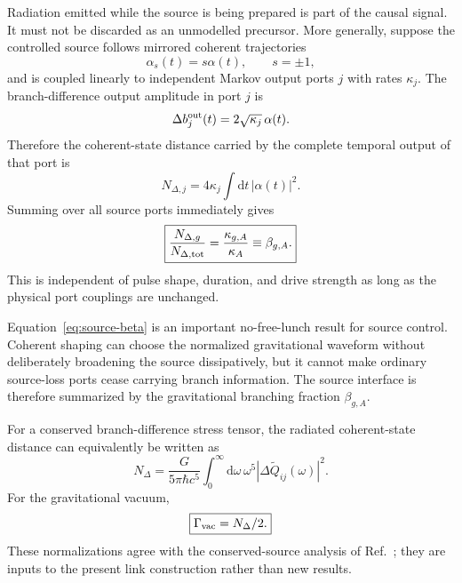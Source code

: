 \documentclass[11pt]{article}
\newcommand{\dd}{\mathrm{d}}
\begin{document}
Radiation emitted while the source is being prepared is part of the causal signal. It must not be discarded as an unmodelled precursor. More generally, suppose the controlled source follows mirrored coherent trajectories
\begin{equation}
\alpha_s(t)=s\alpha(t),
\qquad s=\pm1,
\end{equation}
and is coupled linearly to independent Markov output ports $j$ with rates $\kappa_j$. The branch-difference output amplitude in port $j$ is
\begin{equation}
\Delta b_j^{\rm out}(t)=2\sqrt{\kappa_j}\,\alpha(t).
\end{equation}
Therefore the coherent-state distance carried by the complete temporal output of that port is
\begin{equation}
\boxed{
N_{\Delta,j}
=4\kappa_j\int\dd t\,|\alpha(t)|^2.
}
\label{eq:Npartition}
\end{equation}
Summing over all source ports immediately gives
\begin{equation}
\boxed{
\frac{N_{\Delta,g}}
{N_{\Delta,{\rm tot}}}
=
\frac{\kappa_{g,A}}{\kappa_A}
\equiv\beta_{g,A}.
}
\label{eq:source-beta}
\end{equation}
This is independent of pulse shape, duration, and drive strength as long as the physical port couplings are unchanged.

Equation~\eqref{eq:source-beta} is an important no-free-lunch result for source control. Coherent shaping can choose the normalized gravitational waveform without deliberately broadening the source dissipatively, but it cannot make ordinary source-loss ports cease carrying branch information. The source interface is therefore summarized by the gravitational branching fraction $\beta_{g,A}$.

For a conserved branch-difference stress tensor, the radiated coherent-state distance can equivalently be written as
\begin{equation}
\boxed{
N_\Delta
=\frac{G}{5\pi\hbar c^5}
\int_0^\infty\dd\omega\,
\omega^5
|\Delta\widetilde Q_{ij}(\omega)|^2.
}
\label{eq:Ndelta}
\end{equation}
For the gravitational vacuum,
\begin{equation}
\boxed{\Gamma_{\rm vac}=N_\Delta/2.}
\label{eq:GammaN}
\end{equation}
These normalizations agree with the conserved-source analysis of Ref.~\cite{Matsui2026}; they are inputs to the present link construction rather than new results.
\end{document}
